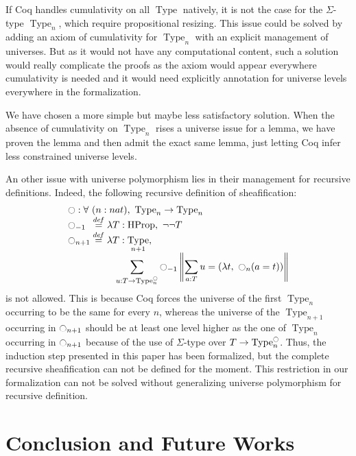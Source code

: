 \documentclass[conference]{IEEEtran}
\newcommand \defeq {\overset{de\hspace{-0.2ex}f}{=}}
\newcommand{\mynote}[2]{
    \fbox{\bfseries\sffamily\scriptsize#1}
    {\small$\blacktriangleright$\textsf{\emph{#2}}$\blacktriangleleft$}~}
\newcommand\nt[1]{\mynote{NT}{#1}}
\DeclareMathOperator{\Type}{Type}
\DeclareMathOperator{\HProp}{HProp}
\newcommand{\modal}{\ensuremath{\ocircle}}
\begin{document}
%
If Coq handles cumulativity on all $\Type$ natively, it is not
the case for the $\Sigma$-type $\Type_n$, which require propositional
resizing. 
%
This issue could be solved by adding an axiom of cumulativity
for $\Type_n$ with an explicit management of universes. 
%
But as it would not have any computational content, such a solution
would really complicate the proofs as the axiom would appear
everywhere cumulativity is needed and it would need explicitly
annotation for universe levels everywhere in the formalization.

We have chosen a more simple but maybe less satisfactory solution. 
%
When the absence of cumulativity on $\Type_n$ rises a universe issue
for a lemma, we have proven the lemma and then admit the exact same
lemma, just letting Coq infer less constrained universe levels.

An other issue with universe polymorphism lies in their management for
recursive definitions. Indeed, the following recursive definition of
sheafification:
%
\[ \begin{array}{l}
   \modal : \forall \ (n : nat), \ \Type_n \to \Type_n 
   \\
    \modal_{-1\phantom{n}} \defeq \lambda T:\HProp,~ \lnot\lnot T \\
      \displaystyle{\modal_{n+1} \defeq  \lambda T:\Type_{n+1}},\\
      \hspace{5em} \displaystyle{\sum_{u:T \to \Type_n^\modal} \modal_{-1} 
      \left\|
      \sum_{a:T} u= (\lambda t,~\modal_n (a=t))
      \right\|}
    \end{array}
\]
%
is not allowed. 
%
This is because Coq forces the universe of the first $\Type_n$
occurring to be the same for every $n$, whereas the universe of the
$\Type_{n+1}$ occurring in $\modal_{n+1}$ should be at least one level
higher as the one of $\Type_n$ occurring in $\modal_{n+1}$ because of
the use of $\Sigma$-type over $T \to \Type_n^\modal$.
%
%
Thus, the induction step presented in this paper has been formalized,
but the complete recursive sheafification can not be defined for the
moment.
%
This restriction in our formalization can not be solved without
generalizing universe polymorphism for recursive definition.
%



\section{Conclusion and Future Works}
\label{sec:future-works}
\end{document}

